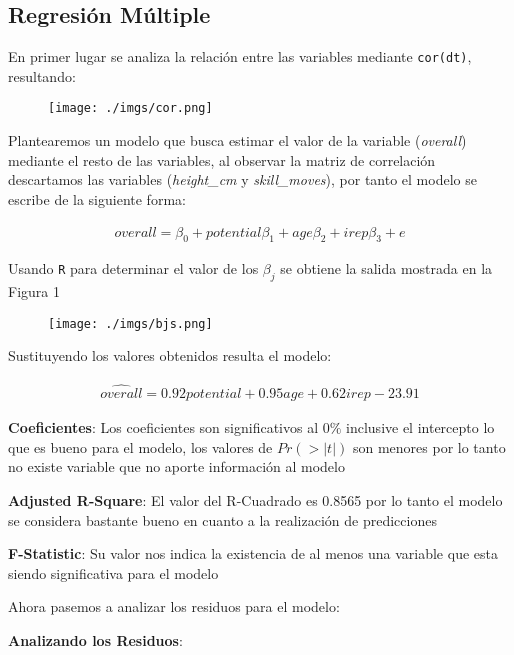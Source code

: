 \documentclass[a4paper,10pt,twocolumn]{article}
\begin{document}
\subsection*{Regresi\'on M\'ultiple}

En primer lugar se analiza la relaci\'on entre las variables mediante \verb|cor(dt)|, resultando:

\begin{figure}[h]
	\texttt{[image: ./imgs/cor.png]}
\end{figure}

Plantearemos un modelo que busca estimar el valor de la variable (\textit{overall}) mediante el resto de las variables, al observar la matriz de correlaci\'on descartamos las variables (\textit{height\_cm} y \textit{skill\_moves}), por tanto el modelo se escribe de la siguiente forma:

\begin{align*}
	overall = \beta_0 + potential \beta_1 + age \beta_2 + irep \beta_3 + e
\end{align*}

Usando \verb|R| para determinar el valor de los $\beta_j$ se obtiene la salida mostrada en la Figura 1

\begin{figure}[h]
	\texttt{[image: ./imgs/bjs.png]}
\end{figure}

Sustituyendo los valores obtenidos resulta el modelo:

\begin{align*}
	\widehat{overall} = 0.92 potential + 0.95 age + 0.62 irep - 23.91
\end{align*}

\textbf{Coeficientes}: Los coeficientes son significativos al $0\%$ inclusive el intercepto lo que es bueno para el modelo, los valores de $Pr(>|t|)$ son menores por lo tanto no existe variable que no aporte informaci\'on al modelo

\textbf{Adjusted R-Square}: El valor del R-Cuadrado es 0.8565 por lo tanto el modelo se considera bastante bueno en cuanto a la realizaci\'on de predicciones

\textbf{F-Statistic}: Su valor nos indica la existencia de al menos una variable que esta siendo significativa para el modelo

Ahora pasemos a analizar los residuos para el modelo:

\textbf{Analizando los Residuos}:
\end{document}

